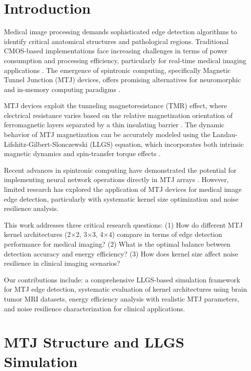 \documentclass[conference]{IEEEtran}
\begin{document}
\section{Introduction}

Medical image processing demands sophisticated edge detection algorithms to identify critical anatomical structures and pathological regions. Traditional CMOS-based implementations face increasing challenges in terms of power consumption and processing efficiency, particularly for real-time medical imaging applications \cite{b1}. The emergence of spintronic computing, specifically Magnetic Tunnel Junction (MTJ) devices, offers promising alternatives for neuromorphic and in-memory computing paradigms \cite{b2}.

MTJ devices exploit the tunneling magnetoresistance (TMR) effect, where electrical resistance varies based on the relative magnetization orientation of ferromagnetic layers separated by a thin insulating barrier \cite{b3}. The dynamic behavior of MTJ magnetization can be accurately modeled using the Landau-Lifshitz-Gilbert-Slonczewski (LLGS) equation, which incorporates both intrinsic magnetic dynamics and spin-transfer torque effects \cite{b4}.

Recent advances in spintronic computing have demonstrated the potential for implementing neural network operations directly in MTJ arrays \cite{b5}. However, limited research has explored the application of MTJ devices for medical image edge detection, particularly with systematic kernel size optimization and noise resilience analysis.

This work addresses three critical research questions: (1) How do different MTJ kernel architectures (2×2, 3×3, 4×4) compare in terms of edge detection performance for medical imaging? (2) What is the optimal balance between detection accuracy and energy efficiency? (3) How does kernel size affect noise resilience in clinical imaging scenarios?

Our contributions include: a comprehensive LLGS-based simulation framework for MTJ edge detection, systematic evaluation of kernel architectures using brain tumor MRI datasets, energy efficiency analysis with realistic MTJ parameters, and noise resilience characterization for clinical applications.

\section{MTJ Structure and LLGS Simulation}
\end{document}
